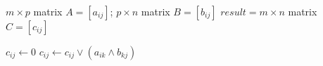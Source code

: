   \REQUIRE $m \times p$ matrix $A = [a_{ij}]$; $p \times n$ matrix $B = [b_{ij}]$
  \ENSURE $result = m \times n$ matrix $C = [c_{ij}]$

		 	  \STATE $c_{ij} \leftarrow 0$
                   \STATE $c_{ij} \leftarrow c_{ij} \vee (a_{ik} \wedge b_{kj})$
  		 	  \ENDFOR
  		 \ENDFOR
  \ENDFOR
